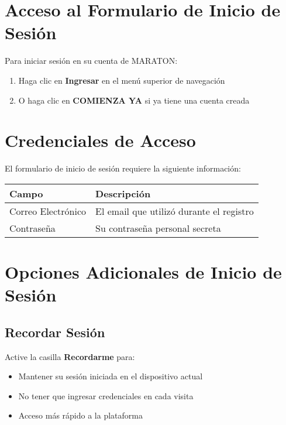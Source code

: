 \documentclass[11pt,a4paper,twoside]{book}
\begin{document}
\section{Acceso al Formulario de Inicio de Sesión}

Para iniciar sesión en su cuenta de MARATON:

\begin{enumerate}
    \item Haga clic en \textbf{Ingresar} en el menú superior de navegación
    \item O haga clic en \textbf{COMIENZA YA} si ya tiene una cuenta creada
\end{enumerate}

\section{Credenciales de Acceso}

El formulario de inicio de sesión requiere la siguiente información:

\begin{table}[h]
\centering
\begin{tabular}{@{}p{5cm}p{9cm}@{}}
\toprule
\textbf{Campo} & \textbf{Descripción} \\ \midrule
Correo Electrónico & El email que utilizó durante el registro \\
Contraseña & Su contraseña personal secreta \\ \bottomrule
\end{tabular}
\end{table}

\section{Opciones Adicionales de Inicio de Sesión}

\subsection{Recordar Sesión}

Active la casilla \textbf{Recordarme} para:
\begin{itemize}
    \item Mantener su sesión iniciada en el dispositivo actual
    \item No tener que ingresar credenciales en cada visita
    \item Acceso más rápido a la plataforma
\end{itemize}
\end{document}
